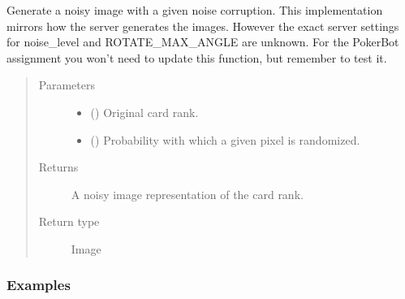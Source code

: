 \documentclass[letterpaper,10pt,english]{sphinxmanual}
\begin{document}
\begin{fulllineitems}
\label{\detokenize{data_sets:data_sets.generate_noisy_image}}
\pysigstartsignatures
{}
\pysigstopsignatures
\sphinxAtStartPar
Generate a noisy image with a given noise corruption. This implementation mirrors how the server generates the
images. However the exact server settings for noise\_level and ROTATE\_MAX\_ANGLE are unknown.
For the PokerBot assignment you won’t need to update this function, but remember to test it.
\begin{quote}\begin{description}
\item[{Parameters}] \leavevmode\begin{itemize}
\item {} 
\sphinxAtStartPar
{} (\sphinxstyleliteralemphasis{\sphinxupquote{ {[}}}\sphinxstyleliteralemphasis{\sphinxupquote{, }}\sphinxstyleliteralemphasis{\sphinxupquote{, }}\sphinxstyleliteralemphasis{\sphinxupquote{,}}\sphinxstyleliteralemphasis{\sphinxupquote{{]}}}) \textendash{} Original card rank.

\item {} 
\sphinxAtStartPar
{} () \textendash{} Probability with which a given pixel is randomized.

\end{itemize}

\item[{Returns}] \leavevmode
\sphinxAtStartPar
{} \textendash{} A noisy image representation of the card rank.

\item[{Return type}] \leavevmode
\sphinxAtStartPar
Image

\end{description}\end{quote}
\subsubsection*{Examples}

\begin{sphinxVerbatim}[commandchars=\\\{\}]
\end{sphinxVerbatim}

\end{fulllineitems}
\end{document}
